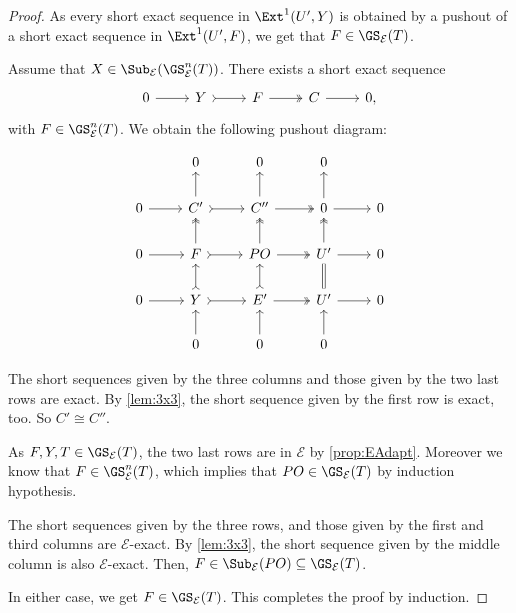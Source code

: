 \begin{proof}
As every short exact sequence in $\Ext^1(U',Y)$ is obtained by a pushout of a short exact sequence in $\Ext^1(U',F)$, we get that $F \in \GS_{\mathcal{E}}(T)$.

Assume that  $X \in \Sub_\mathcal{E}(\GS^{n}_{\mathcal{E}}(T))$. There exists a short exact sequence \[\begin{tikzcd}
	0 & Y & F  & C&  0,
	\arrow[from=1-1, to=1-2]
	\arrow[tail, from=1-2, to=1-3]
	\arrow[two heads,from=1-3, to=1-4]
	\arrow[from=1-4, to=1-5]
\end{tikzcd} \] with $F \in \GS^{n}_{\mathcal{E}}(T)$. We obtain the following pushout diagram:

\[\begin{tikzcd}
         & 0 & 0 & 0 &  \\
	0 & C' & C''  & 0 &  0 \\
     0 & F & PO & U' & 0 \\
      0 & Y & E' & U' & 0 \\
       & 0 & 0 & 0 & 
	\arrow[from=2-1, to=2-2]
	\arrow[tail, from=2-2, to=2-3]
	\arrow[two heads,from=2-3, to=2-4]
	\arrow[from=2-4, to=2-5]
        \arrow[from=3-1, to=3-2]
	\arrow[tail, from=3-2, to=3-3]
	\arrow[two heads,from=3-3, to=3-4]
	\arrow[from=3-4, to=3-5]
        \arrow[from=4-1, to=4-2]
	\arrow[tail, from=4-2, to=4-3]
	\arrow[two heads,from=4-3, to=4-4]
	\arrow[from=4-4, to=4-5]
        \arrow[from=5-2, to=4-2]
	\arrow[tail, from=4-2, to=3-2]
	\arrow[two heads,from=3-2, to=2-2]
	\arrow[from=2-2, to=1-2]
        \arrow[from=5-3, to=4-3]
	\arrow[tail, from=4-3, to=3-3]
	\arrow[two heads,from=3-3, to=2-3]
	\arrow[from=2-3, to=1-3]
        \arrow[from=5-4, to=4-4]
	\arrow[equals, from=4-4, to=3-4]
	\arrow[two heads,from=3-4, to=2-4]
	\arrow[from=2-4, to=1-4]
\end{tikzcd} \]

The short sequences given by the three columns and those given by the two last rows are exact. By \cref{lem:3x3}, the short sequence given by the first row is exact, too. So $C' \cong C''$.

As $F,Y,T \in \GS_{\mathcal{E}}(T)$, the two last rows are in $\mathcal{E}$ by \cref{prop:EAdapt}. Moreover we know that $F \in \GS^{n}_{\mathcal{E}}(T)$, which implies that $PO \in \GS_{\mathcal{E}}(T)$ by induction hypothesis.

The short sequences given by the three rows, and those given by the first and third columns are $\mathcal{E}$-exact. By \cref{lem:3x3}, the short sequence given by the middle column is also $\mathcal{E}$-exact. Then, $F \in \Sub_\mathcal{E}(PO) \subseteq \GS_{\mathcal{E}}(T)$. 

In either case, we get $F \in \GS_\mathcal{E}(T)$. This completes the proof by induction.
\end{proof}

